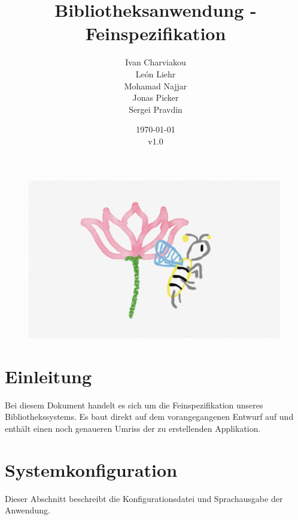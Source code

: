 \documentclass{article}
\title{Bibliotheksanwendung - Feinspezifikation}
\date{\today\\v1.0}
\author{
	Ivan Charviakou\\
	León Liehr\\
	Mohamad Najjar\\
	Jonas Picker\\
	Sergei Pravdin
}
\begin{document}
\maketitle
\begin{figure}[h]
	\centering
	\includegraphics[width = 30em]{Logo}
\end{figure}
\newpage
\tableofcontents
\newpage

\section{Einleitung}
Bei diesem Dokument handelt es sich um die Feinspezifikation unseres Bibliothekssystems. Es baut direkt auf dem vorangegangenen Entwurf auf und enthält einen noch genaueren Umriss der zu erstellenden Applikation.







\section{Systemkonfiguration}
Dieser Abschnitt beschreibt die Konfigurationsdatei und Sprachausgabe der Anwendung.
\end{document}
